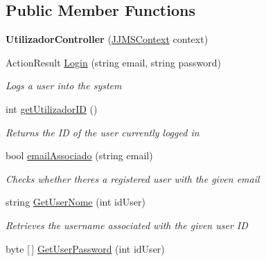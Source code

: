 \subsection*{Public Member Functions}
\begin{DoxyCompactItemize}
\item 
\mbox{\label{classmvc_j_j_m_s_1_1_controllers_1_1_utilizador_controller_a1d833224478b16de3a404928df7c6fb0}} 
{\bfseries Utilizador\+Controller} (\mbox{\hyperlink{classmvc_j_j_m_s_1_1_data_1_1_j_j_m_s_context}{J\+J\+M\+S\+Context}} context)
\item 
Action\+Result \mbox{\hyperlink{classmvc_j_j_m_s_1_1_controllers_1_1_utilizador_controller_af8335bb74fe7e7b4cbab85a176775c30}{Login}} (string email, string password)
\begin{DoxyCompactList}\small\item\em Logs a user into the system \end{DoxyCompactList}\item 
int \mbox{\hyperlink{classmvc_j_j_m_s_1_1_controllers_1_1_utilizador_controller_a8243cd298846e34fb97c3c7d2d691174}{get\+Utilizador\+ID}} ()
\begin{DoxyCompactList}\small\item\em Returns the ID of the user currently logged in \end{DoxyCompactList}\item 
bool \mbox{\hyperlink{classmvc_j_j_m_s_1_1_controllers_1_1_utilizador_controller_abc0b8e9e7e35ee0c6f910a4fc63bb6d2}{email\+Associado}} (string email)
\begin{DoxyCompactList}\small\item\em Checks whether there\textquotesingle{}s a registered user with the given email \end{DoxyCompactList}\item 
string \mbox{\hyperlink{classmvc_j_j_m_s_1_1_controllers_1_1_utilizador_controller_a6250c090d89e8a6cea8347d9186daeb0}{Get\+User\+Nome}} (int id\+User)
\begin{DoxyCompactList}\small\item\em Retrieves the username associated with the given user ID \end{DoxyCompactList}\item 
byte \mbox{[}$\,$\mbox{]} \mbox{\hyperlink{classmvc_j_j_m_s_1_1_controllers_1_1_utilizador_controller_a71ba7901a09e013703d461927ab9ff80}{Get\+User\+Password}} (int id\+User)

\end{DoxyCompactItemize}
